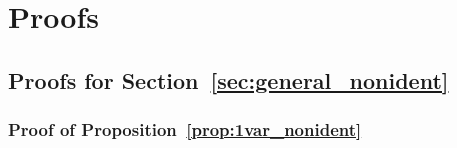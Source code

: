 \documentclass{article}
\theoremstyle{plain}
\theoremstyle{definition}
\begin{document}
{%






\appendix


\newpage

\section{Proofs} \label{appendix:proofs}


\subsection{Proofs for Section~\ref{sec:general_nonident}} \label{appendix:proofs_section2}

\subsubsection{Proof of Proposition~\ref{prop:1var_nonident}} \label{appendix:proof_1var}

}
\end{document}
